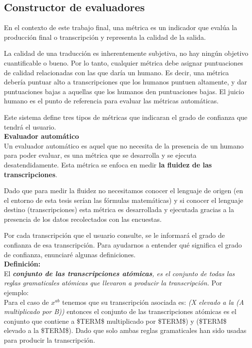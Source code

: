 \subsection{Constructor de evaluadores}

En el contexto de este trabajo final, una métrica es un indicador que evalúa la producción final o transcripción y representa la calidad de la salida.

La calidad de una traducción es inherentemente subjetiva, no hay ningún objetivo cuantificable o bueno. Por lo tanto, cualquier métrica debe asignar puntuaciones de calidad relacionadas con las que daría un humano. Es decir, una métrica debería puntuar alto a transcripciones que los humanos puntuen altamente, y dar puntuaciones bajas a aquellas que los humanos den puntuaciones bajas. El juicio humano es el punto de referencia para evaluar las métricas automáticas.

Este sistema define tres tipos de métricas que indicaran el grado de confianza que tendrá el usuario.\\

{\Large \textbf{Evaluador automático}}\\

Un evaluador automático es aquel que no necesita de la presencia de un humano para poder evaluar, es una métrica que se desarrolla y se ejecuta desatendidamente. Esta métrica se enfoca en medir \textbf{la fluidez de las transcripciones}.

Dado que para medir la fluidez no necesitamos conocer el lenguaje de origen (en el entorno de esta tesis serían las fórmulas matemáticas) y si conocer el lenguaje destino (transcripciones) esta métrica es desarrollada y ejecutada gracias a la presencia de los datos recolectados con las encuestas.

Por cada transcripción que el usuario consulte, se le informará el grado de confianza de esa transcripción. Para ayudarnos a entender qué significa el grado de confianza, enunciaré algunas definiciones.\\

\textbf{Definición:}\\El \textit{\textbf{conjunto de las transcripciones atómicas}, es el conjunto de todas las reglas gramaticales atómicas que llevaron a producir la transcripción.}
Por ejemplo:\\
Para el caso de $x^{ab}$ tenemos que su transcripción asociada es: \textit{(X elevado a la (A multiplicado por B))} entonces el conjunto de las transcripciones atómicas es el conjunto que contiene a \$TERM\$ multiplicado por \$TERM\$) y (\$TERM\$ elevado a la \$TERM\$). Dado que solo ambas reglas gramaticales han sido usadas para producir la transcripción.\\

